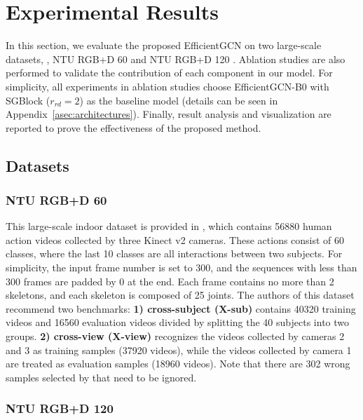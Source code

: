 \documentclass[10pt,journal,compsoc]{IEEEtran}
\begin{document}
\section{Experimental Results}
\label{sec:experiments}

In this section, we evaluate the proposed EfficientGCN on two large-scale datasets, \ie, NTU RGB+D 60 \cite{shahroudy2016ntu} and NTU RGB+D 120 \cite{liu2019ntu}. Ablation studies are also performed to validate the contribution of each component in our model. For simplicity, all experiments in ablation studies choose EfficientGCN-B0 with SGBlock ($r_{rd}=2$) as the baseline model (details can be seen in Appendix~\ref{asec:architectures}). Finally, result analysis and visualization are reported to prove the effectiveness of the proposed method.

\subsection{Datasets}
\label{ssec:datasets}

\subsubsection{NTU RGB+D 60}
\label{sssec:dataset_ntu60}

This large-scale indoor dataset is provided in \cite{shahroudy2016ntu}, which contains 56880 human action videos collected by three Kinect v2 cameras. These actions consist of 60 classes, where the last 10 classes are all interactions between two subjects. For simplicity, the input frame number is set to 300, and the sequences with less than 300 frames are padded by 0 at the end. Each frame contains no more than 2 skeletons, and each skeleton is composed of 25 joints. The authors of this dataset recommend two benchmarks: {\bf 1) cross-subject (X-sub)} contains 40320 training videos and 16560 evaluation videos divided by splitting the 40 subjects into two groups. {\bf 2) cross-view (X-view)} recognizes the videos collected by cameras 2 and 3 as training samples (37920 videos), while the videos collected by camera 1 are treated as evaluation samples (18960 videos). Note that there are 302 wrong samples selected by \cite{liu2019ntu} that need to be ignored.

\subsubsection{NTU RGB+D 120}
\label{sssec:dataset_ntu120}
\end{document}
